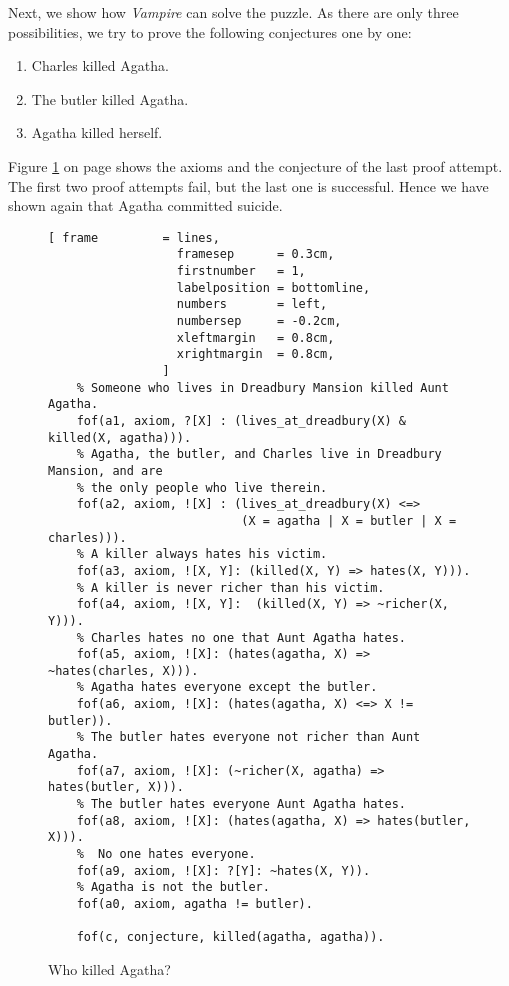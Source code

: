 Next, we show how \textsl{Vampire} can solve the puzzle.
As there are only three possibilities, we try to prove the following conjectures one by one:
\begin{enumerate}
\item Charles killed Agatha.
\item The butler killed Agatha.
\item Agatha killed herself.
\end{enumerate}
Figure \ref{fig:who-killed-agatha.tptp} on page \pageref{fig:who-killed-agatha.tptp} shows the axioms
and the conjecture of the last proof attempt.  The first two proof attempts fail, but the last one is
successful.  Hence we have shown again that Agatha committed suicide. 

\begin{figure}[!ht]
\centering
\begin{Verbatim}[ frame         = lines, 
                  framesep      = 0.3cm, 
                  firstnumber   = 1,
                  labelposition = bottomline,
                  numbers       = left,
                  numbersep     = -0.2cm,
                  xleftmargin   = 0.8cm,
                  xrightmargin  = 0.8cm,
                ]
    % Someone who lives in Dreadbury Mansion killed Aunt Agatha.
    fof(a1, axiom, ?[X] : (lives_at_dreadbury(X) & killed(X, agatha))).
    % Agatha, the butler, and Charles live in Dreadbury Mansion, and are 
    % the only people who live therein.
    fof(a2, axiom, ![X] : (lives_at_dreadbury(X) <=>
                           (X = agatha | X = butler | X = charles))).
    % A killer always hates his victim.
    fof(a3, axiom, ![X, Y]: (killed(X, Y) => hates(X, Y))).
    % A killer is never richer than his victim.
    fof(a4, axiom, ![X, Y]:  (killed(X, Y) => ~richer(X, Y))).
    % Charles hates no one that Aunt Agatha hates.
    fof(a5, axiom, ![X]: (hates(agatha, X) => ~hates(charles, X))).
    % Agatha hates everyone except the butler.
    fof(a6, axiom, ![X]: (hates(agatha, X) <=> X != butler)).
    % The butler hates everyone not richer than Aunt Agatha.
    fof(a7, axiom, ![X]: (~richer(X, agatha) => hates(butler, X))).
    % The butler hates everyone Aunt Agatha hates.
    fof(a8, axiom, ![X]: (hates(agatha, X) => hates(butler, X))).
    %  No one hates everyone.
    fof(a9, axiom, ![X]: ?[Y]: ~hates(X, Y)).
    % Agatha is not the butler.
    fof(a0, axiom, agatha != butler).

    fof(c, conjecture, killed(agatha, agatha)).
\end{Verbatim}
\vspace*{-0.3cm}
\caption{Who killed Agatha?}
\label{fig:who-killed-agatha.tptp}
\end{figure}


